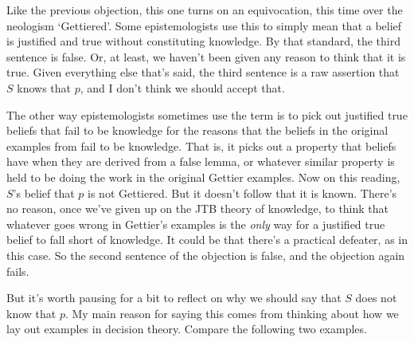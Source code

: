 {Like the previous objection, this one turns on an equivocation, this time over the neologism `Gettiered'. Some epistemologists use this to simply mean that a belief is justified and true without constituting knowledge. By that standard, the third sentence is false. Or, at least, we haven't been given any reason to think that it is true. Given everything else that's said, the third sentence is a raw assertion that \(S\) knows that \(p\), and I don't think we should accept that.

The other way epistemologists sometimes use the term is to pick out justified true beliefs that fail to be knowledge for the reasons that the beliefs in the original examples from \cite{Gettier1963} fail to be knowledge. That is, it picks out a property that beliefs have when they are derived from a false lemma, or whatever similar property is held to be doing the work in the original Gettier examples. Now on this reading, \(S\)'s belief that \(p\) is not Gettiered. But it doesn't follow that it is known. There's no reason, once we've given up on the JTB theory of knowledge, to think that whatever goes wrong in Gettier's examples is the \textit{only} way for a justified true belief to fall short of knowledge. It could be that there's a practical defeater, as in this case. So the second sentence of the objection is false, and the objection again fails.

But it's worth pausing for a bit to reflect on why we should say that \(S\) does not know that \(p\). My main reason for saying this comes from thinking about how we lay out examples in decision theory. Compare the following two examples.

}
